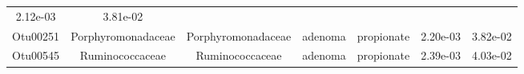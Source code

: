 \documentclass[11pt,]{article}
\begin{document}
\begin{longtable}[]{@{}ccccccc@{}}
\begin{minipage}[t]{0.09\columnwidth}
2.12e-03\strut
\end{minipage} & \begin{minipage}[t]{0.09\columnwidth}\centering\strut
3.81e-02\strut
\end{minipage}\tabularnewline
\begin{minipage}[t]{0.09\columnwidth}\centering\strut
Otu00251\strut
\end{minipage} & \begin{minipage}[t]{0.17\columnwidth}\centering\strut
Porphyromonadaceae\strut
\end{minipage} & \begin{minipage}[t]{0.17\columnwidth}\centering\strut
Porphyromonadaceae\strut
\end{minipage} & \begin{minipage}[t]{0.09\columnwidth}\centering\strut
adenoma\strut
\end{minipage} & \begin{minipage}[t]{0.11\columnwidth}\centering\strut
propionate\strut
\end{minipage} & \begin{minipage}[t]{0.09\columnwidth}\centering\strut
2.20e-03\strut
\end{minipage} & \begin{minipage}[t]{0.09\columnwidth}\centering\strut
3.82e-02\strut
\end{minipage}\tabularnewline
\begin{minipage}[t]{0.09\columnwidth}\centering\strut
Otu00545\strut
\end{minipage} & \begin{minipage}[t]{0.17\columnwidth}\centering\strut
Ruminococcaceae\strut
\end{minipage} & \begin{minipage}[t]{0.17\columnwidth}\centering\strut
Ruminococcaceae\strut
\end{minipage} & \begin{minipage}[t]{0.09\columnwidth}\centering\strut
adenoma\strut
\end{minipage} & \begin{minipage}[t]{0.11\columnwidth}\centering\strut
propionate\strut
\end{minipage} & \begin{minipage}[t]{0.09\columnwidth}\centering\strut
2.39e-03\strut
\end{minipage} & \begin{minipage}[t]{0.09\columnwidth}\centering\strut
4.03e-02\strut
\end{minipage}\tabularnewline

\end{longtable}
\end{document}
